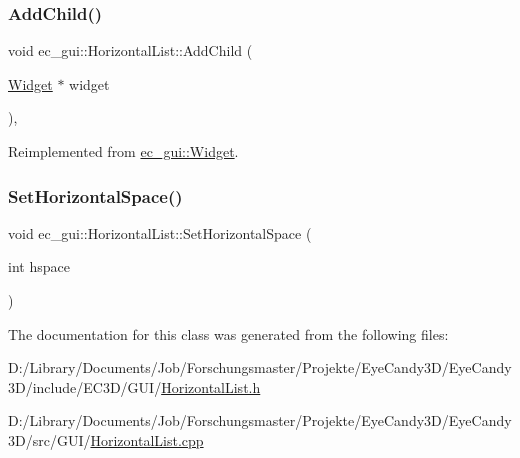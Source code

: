 \subsubsection{\texorpdfstring{Add\+Child()}{AddChild()}}
{\footnotesize\ttfamily void ec\+\_\+gui\+::\+Horizontal\+List\+::\+Add\+Child (\begin{DoxyParamCaption}\item[{\mbox{\hyperlink{classec__gui_1_1_widget}{Widget}} $\ast$}]{widget }\end{DoxyParamCaption})\hspace{0.3cm}{\ttfamily [override]}, {\ttfamily [virtual]}}



Reimplemented from \mbox{\hyperlink{classec__gui_1_1_widget_ac6e916b4ca37bff9ef9167eab55062f6}{ec\+\_\+gui\+::\+Widget}}.

\mbox{\label{classec__gui_1_1_horizontal_list_a2a05b26a25043bb39523edcea32547c5}} 
\subsubsection{\texorpdfstring{Set\+Horizontal\+Space()}{SetHorizontalSpace()}}
{\footnotesize\ttfamily void ec\+\_\+gui\+::\+Horizontal\+List\+::\+Set\+Horizontal\+Space (\begin{DoxyParamCaption}\item[{int}]{hspace }\end{DoxyParamCaption})}



The documentation for this class was generated from the following files\+:\begin{DoxyCompactItemize}
\item 
D\+:/\+Library/\+Documents/\+Job/\+Forschungsmaster/\+Projekte/\+Eye\+Candy3\+D/\+Eye\+Candy3\+D/include/\+E\+C3\+D/\+G\+U\+I/\mbox{\hyperlink{_horizontal_list_8h}{Horizontal\+List.\+h}}\item 
D\+:/\+Library/\+Documents/\+Job/\+Forschungsmaster/\+Projekte/\+Eye\+Candy3\+D/\+Eye\+Candy3\+D/src/\+G\+U\+I/\mbox{\hyperlink{_horizontal_list_8cpp}{Horizontal\+List.\+cpp}}\end{DoxyCompactItemize}
